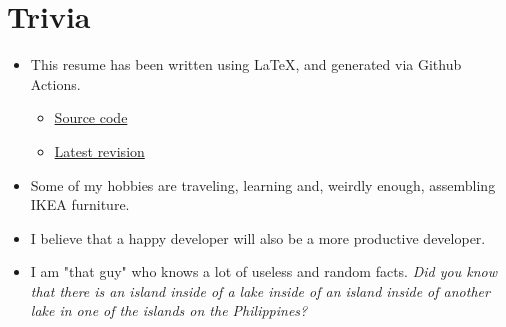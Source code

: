 \documentclass{article}
\begin{document}
{	\section*{Trivia}
	\begin{itemize}
		\item This resume has been written using \LaTeX, and generated via Github Actions.
		\begin{itemize}
			\item \textcolor{Green}{\href{https://github.com/Kyngo/Resume}{Source code}}
			\item \textcolor{Green}{\href{https://github.com/Kyngo/Resume/releases/latest}{Latest revision}}
		\end{itemize}
		\item Some of my hobbies are traveling, learning and, weirdly enough, assembling IKEA furniture.
		\item I believe that a happy developer will also be a more productive developer.
		\item I am "that guy" who knows a lot of useless and random facts. \textit{Did you know that there is an island inside of a lake inside of an island inside of another lake in one of the islands on the Philippines?}
	\end{itemize}
	
}
\end{document}
